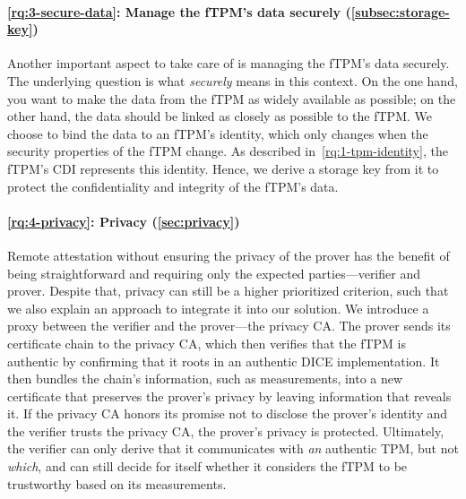 \paragraph{\ref{rq:3-secure-data}: Manage the fTPM's data securely (\autoref{subsec:storage-key})}
Another important aspect to take care of is managing the fTPM's data securely.
The underlying question is what \emph{securely} means in this context.
On the one hand, you want to make the data from the fTPM as widely available as possible; on the other hand, the data should be linked as closely as possible to the fTPM\@.
We choose to bind the data to an fTPM's identity, which only changes when the security properties of the fTPM change.
As described in~\hyperref[par:identity]{\ref*{rq:1-tpm-identity}}, the fTPM's \ac{CDI} represents this identity.
Hence, we derive a storage key from it to protect the confidentiality and integrity of the fTPM's data.

\paragraph{\ref{rq:4-privacy}: Privacy (\autoref{sec:privacy})}
Remote attestation without ensuring the privacy of the prover has the benefit of being straightforward and requiring only the expected parties---verifier and prover.
Despite that, privacy can still be a higher prioritized criterion, such that we also explain an approach to integrate it into our solution.
We introduce a proxy between the verifier and the prover---the privacy CA\@.
The prover sends its certificate chain to the privacy CA, which then verifies that the \ac{fTPM} is authentic by confirming that it roots in an authentic DICE implementation.
It then bundles the chain's information, such as measurements, into a new certificate that preserves the prover's privacy by leaving information that reveals it.
If the privacy CA honors its promise not to disclose the prover's identity and the verifier trusts the privacy CA, the prover's privacy is protected.
Ultimately, the verifier can only derive that it communicates with \emph{an} authentic TPM, but not \emph{which}, and can still decide for itself whether it considers the \ac{fTPM} to be trustworthy based on its measurements.


